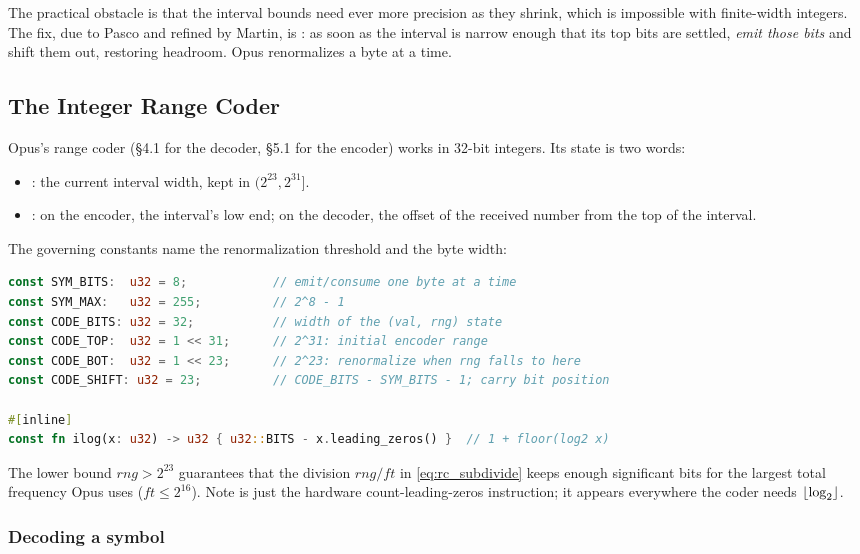 The practical obstacle is that the interval bounds need ever more precision as
they shrink, which is impossible with finite-width integers. The fix, due to
Pasco and refined by Martin, is : as soon as the
interval is narrow enough that its top bits are settled, \emph{emit those bits}
and shift them out, restoring headroom. Opus renormalizes a byte at a time.

\subsection{The Integer Range Coder}\label{subsec:integer_rc}

Opus's range coder (\S4.1 for the decoder, \S5.1 for the encoder) works in
32-bit integers. Its state is two words:

\begin{itemize}[itemsep=2pt]
  \item {}: the current interval width, kept in
    $(2^{23}, 2^{31}]$.
  \item {}: on the encoder, the interval's low end; on the decoder,
    the offset of the received number from the top of the interval.
\end{itemize}

The governing constants name the renormalization threshold and the byte width:

\begin{lstlisting}[language=Rust]
const SYM_BITS:  u32 = 8;            // emit/consume one byte at a time
const SYM_MAX:   u32 = 255;          // 2^8 - 1
const CODE_BITS: u32 = 32;           // width of the (val, rng) state
const CODE_TOP:  u32 = 1 << 31;      // 2^31: initial encoder range
const CODE_BOT:  u32 = 1 << 23;      // 2^23: renormalize when rng falls to here
const CODE_SHIFT: u32 = 23;          // CODE_BITS - SYM_BITS - 1; carry bit position

#[inline]
const fn ilog(x: u32) -> u32 { u32::BITS - x.leading_zeros() }  // 1 + floor(log2 x)
\end{lstlisting}

The lower bound $\mathit{rng} > 2^{23}$ guarantees that the division
$\mathit{rng}/\mathit{ft}$ in \cref{eq:rc_subdivide} keeps enough significant
bits for the largest total frequency Opus uses ($\mathit{ft} \le 2^{16}$). Note
 is just the hardware count-leading-zeros instruction; it appears
everywhere the coder needs $\floor*{\log_2}$.

\subsubsection{Decoding a symbol}

